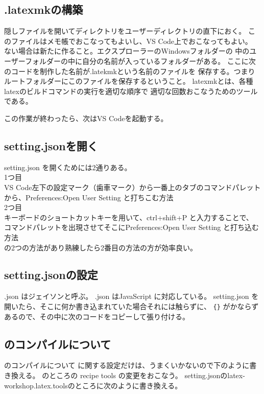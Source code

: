 \documentclass{ltjsarticle}
\begin{document}
\subsection{.latexmkの構築} %

\label{sub:.latexmkの構築}
隠しファイルを開いてディレクトリをユーザーディレクトリの直下におく。
このファイルはメモ帳でおこなってもよいし、VS Code上でおこなってもよい。
ない場合は新たに作ること。エクスプローラーのWindowsフォルダーの
中のユーザーフォルダーの中に自分の名前が入っているフォルダーがある。
ここに次のコードを制作した名前が.latekmkという名前のファイルを
保存する。つまりルートフォルダーにこのファイルを保存するということ。
latexmkとは、各種latexのビルドコマンドの実行を適切な順序で
適切な回数おこなうためのツールである。


この作業が終わったら、次はVS Codeを起動する。
\subsection{setting.jsonを開く}
setting.json を開くためには2通りある。\\
1つ目\\
VS Code左下の設定マーク（歯車マーク）から一番上のタブのコマンドパレット
から、Preferences:Open User Setting と打ちこむ方法\\
2つ目\\
キーボードのショートカットキーを用いて、ctrl+shift+P と入力することで、
コマンドパレットを出現させてそこにPreferences:Open User Setting
と打ち込む方法\\
の2つの方法があり熟練したら2番目の方法の方が効率良い。
\subsection{setting.jsonの設定}
.json はジェイソンと呼ぶ。
.json はJavaScript に対応している。
setting.json を開いたら、そこに何か書き込まれていた場合それには触らずに、
\verb|{}|
がかならずあるので、その中に次のコードをコピーして張り付ける。

\subsection{\pLaTeX のコンパイルについて}
\pLaTeX のコンパイルについて
\pLaTeX に関する設定だけは、うまくいかないので下のように書き換える。
\pLaTeX  のところの
recipe tools の変更をおこなう。
setting.jsonのlatex-workshop.latex.toolsのところに次のように書き換える。
\end{document}
